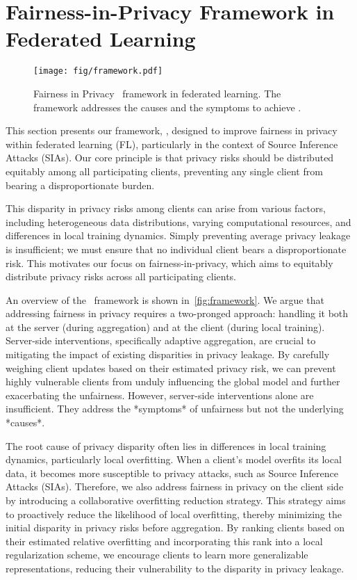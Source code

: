 
\section{Fairness-in-Privacy Framework in Federated Learning}\label{sec:finpmetric}

\begin{figure*}[!t]
\centering
\texttt{[image: fig/framework.pdf]}
\caption{Fairness in Privacy \sysname\ framework in federated learning. The framework addresses the causes and the symptoms to achieve \sysname.}
\label{fig:framework}
\end{figure*}


This section presents our framework, \sysname, designed to improve fairness in privacy within federated learning (FL), particularly in the context of Source Inference Attacks (SIAs). Our core principle is that privacy risks should be distributed equitably among all participating clients, preventing any single client from bearing a disproportionate burden. 
 

This disparity in privacy risks among clients can arise from various factors, including heterogeneous data distributions, varying computational resources, and differences in local training dynamics. Simply preventing average privacy leakage is insufficient; we must ensure that no individual client bears a disproportionate risk. This motivates our focus on fairness-in-privacy, which aims to equitably distribute privacy risks across all participating clients.

An overview of the \sysname\ framework is shown in~\autoref{fig:framework}. We argue that addressing fairness in privacy requires a two-pronged approach: handling it both at the server (during aggregation) and at the client (during local training). Server-side interventions, specifically adaptive aggregation, are crucial to mitigating the impact of existing disparities in privacy leakage. By carefully weighing client updates based on their estimated privacy risk, we can prevent highly vulnerable clients from unduly influencing the global model and further exacerbating the unfairness. However, server-side interventions alone are insufficient. They address the *symptoms* of unfairness but not the underlying *causes*.

The root cause of privacy disparity often lies in differences in local training dynamics, particularly local overfitting. When a client's model overfits its local data, it becomes more susceptible to privacy attacks, such as Source Inference Attacks (SIAs). Therefore, we also address fairness in privacy on the client side by introducing a collaborative overfitting reduction strategy. This strategy aims to proactively reduce the likelihood of local overfitting, thereby minimizing the initial disparity in privacy risks before aggregation. By ranking clients based on their estimated relative overfitting and incorporating this rank into a local regularization scheme, we encourage clients to learn more generalizable representations, reducing their vulnerability to the disparity in privacy leakage.

